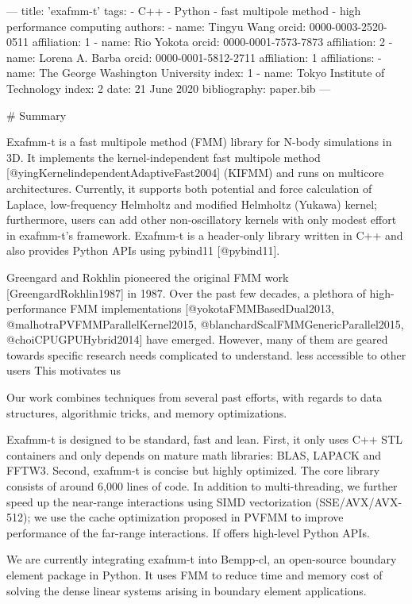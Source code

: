 ---
title: 'exafmm-t'
tags:
  - C++
  - Python
  - fast multipole method
  - high performance computing
authors:
 - name: Tingyu Wang
   orcid: 0000-0003-2520-0511
   affiliation: 1
 - name: Rio Yokota
   orcid: 0000-0001-7573-7873
   affiliation: 2
 - name: Lorena A. Barba
   orcid: 0000-0001-5812-2711
   affiliation: 1
affiliations:
 - name: The George Washington University
   index: 1
 - name: Tokyo Institute of Technology
   index: 2
date: 21 June 2020
bibliography: paper.bib
---

# Summary

Exafmm-t is a fast multipole method (FMM) library for N-body simulations in 3D.
It implements the kernel-independent fast multipole method [@yingKernelindependentAdaptiveFast2004] (KIFMM) and runs on multicore architectures. 
Currently, it supports both potential and force calculation of Laplace, low-frequency Helmholtz and modified Helmholtz (Yukawa) kernel; furthermore, users can add other non-oscillatory kernels with only modest effort in exafmm-t's framework.
Exafmm-t is a header-only library written in C++ and also provides Python APIs using pybind11 [@pybind11].


Greengard and Rokhlin pioneered the original FMM work [GreengardRokhlin1987] in 1987.
Over the past few decades, a plethora of high-performance FMM implementations [@yokotaFMMBasedDual2013, @malhotraPVFMMParallelKernel2015, @blanchardScalFMMGenericParallel2015, @choiCPUGPUHybrid2014] have emerged.
However, many of them are geared towards specific research needs complicated to understand.
less accessible to other users
This motivates us 

Our work combines techniques from several past efforts, with regards to data structures, algorithmic tricks, and memory optimizations.

Exafmm-t is designed to be standard, fast and lean.
First, it only uses C++ STL containers and only depends on mature math libraries: BLAS, LAPACK and FFTW3.
Second, exafmm-t is concise but highly optimized. The core library consists of around 6,000 lines of code.
In addition to multi-threading, we further speed up the near-range interactions using SIMD vectorization (SSE/AVX/AVX-512); we use the cache optimization proposed in PVFMM to improve performance of the far-range interactions.
If offers high-level Python APIs.



We are currently integrating exafmm-t into Bempp-cl, an open-source boundary element package in Python.
It uses FMM to reduce time and memory cost of solving the dense linear systems arising in boundary element applications.